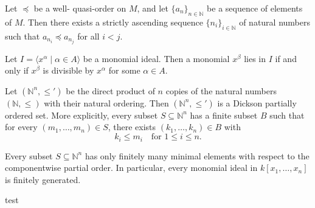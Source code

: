 \begin{proposition}\label{prop:wqoAscendingSubsequence}
    Let $\preceq$ be a well- quasi-order on $M$, and let $\{a_n\}_{n \in \mathbb{N}}$ be a sequence of elements of $M$.
    Then there exists a strictly ascending sequence $\{n_i\}_{i \in \mathbb{N}}$ of natural numbers such that $a_{n_i} \preceq a_{n_j}$ for all $i < j$.
\end{proposition}

\begin{lemma}\label{lem:monomial_ideal}
    Let $I = \langle x^\alpha \mid \alpha \in A \rangle$ be a monomial ideal.
    Then a monomial $x^\beta$ lies in $I$ if and only if $x^\beta$ is divisible by $x^\alpha$ for some $\alpha \in A$.
\end{lemma}

\begin{theorem}\label{thm:Dickson} %
    Let $(\mathbb{N}^n, \le')$ be the direct product of $n$ copies of the natural numbers $(\mathbb{N}, \le)$ with their natural ordering. 
    Then $(\mathbb{N}^n, \le')$ is a Dickson partially ordered set. 
    More explicitly, every subset $S \subseteq \mathbb{N}^n$ has a finite subset $B$ such that for every $(m_1, \dots, m_n) \in S$, there exists $(k_1, \dots, k_n) \in B$ with
    \[
    k_i \le m_i \quad \text{for } 1 \le i \le n.
    \]
\end{theorem}

\begin{theorem}\label{thm:Dickson'}
    Every subset $S\subseteq \mathbb{N}^n$ has only finitely many minimal elements with respect to the componentwise partial order. 
    In particular, every monomial ideal in $k[x_1,\dots,x_n]$ is finitely generated.
\end{theorem}

\begin{theorem}
    test
\end{theorem}